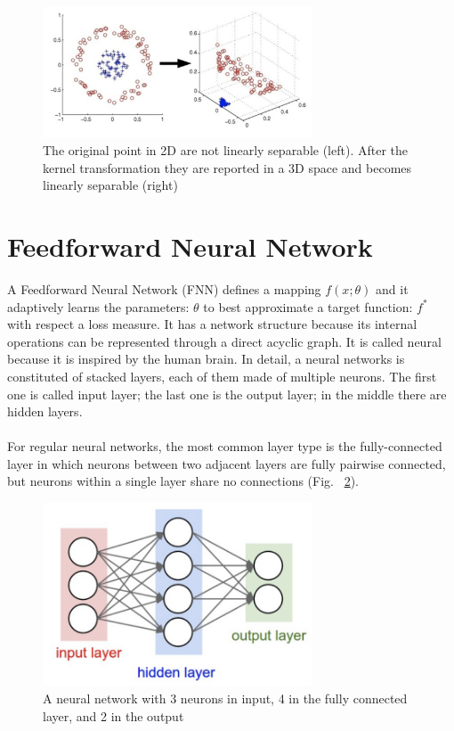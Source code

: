 \documentclass[LaM,binding=0.6cm]{sapthesis}
\begin{document}
\begin{figure}   \centering
    \includegraphics[width=80mm,scale=0.7]{kerneltrick}
    \caption{The original point in 2D are not linearly separable (left). After the kernel transformation they are reported in a 3D space and becomes linearly separable (right)}
    \label{fig:kerneltrick}
\end{figure}

\section{Feedforward Neural Network}
A Feedforward Neural Network (FNN) defines a mapping $f(x;\theta)$ and it adaptively learns the parameters: $\theta$ to best approximate a target function: $f^{*}$ with respect a loss measure. It has a network structure because its internal operations can be represented through a direct acyclic graph. It is called neural because it is inspired by the human brain. In detail, a neural networks is constituted of stacked layers, each of them made of multiple neurons. The first one is called input layer; the last one is the output layer; in the middle there are hidden layers.\\\\For regular neural networks, the most common layer type is the fully-connected layer in which neurons between two adjacent layers are fully pairwise connected, but neurons within a single layer share no connections (Fig. ~\ref{fig:fnnex}).
\begin{figure}   \centering
    \includegraphics[width=80mm,scale=0.7]{fnnex}
    \caption{A neural network with 3 neurons in input, 4 in the fully connected layer, and 2 in the output \cite{cnnsite} }
    \label{fig:fnnex}
\end{figure}
\end{document}
